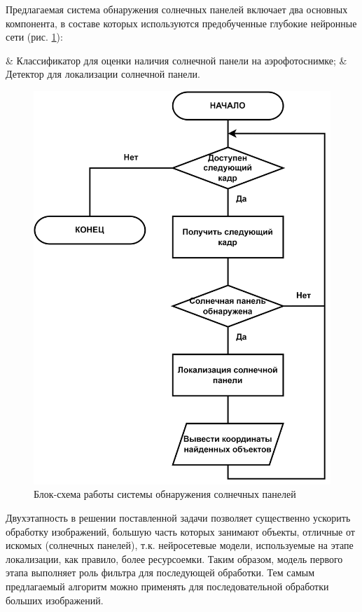 Предлагаемая система обнаружения солнечных панелей включает два основных компонента, в составе которых используются предобученные глубокие нейронные сети (рис. \ref{fig:solar_system_arch}): 

\begin{easylistNum}
    & Классификатор для оценки наличия солнечной панели на аэрофотоснимке;
    & Детектор для локализации солнечной панели.
\end{easylistNum}

\begin{figure}[ht]
	\centering
	\includegraphics[width=12cm]{man-source/images/ch4/pic4-16a.png}
	\caption{Блок-схема работы системы обнаружения солнечных панелей}
	\label{fig:solar_system_arch}
\end{figure}

Двухэтапность в решении поставленной задачи позволяет существенно ускорить обработку изображений, большую часть которых занимают объекты, отличные от искомых (солнечных панелей), т.к. нейросетевые модели, используемые на этапе локализации, как правило, более ресурсоемки. Таким образом, модель первого этапа выполняет роль фильтра для последующей обработки. Тем самым предлагаемый алгоритм можно применять для последовательной обработки больших изображений.

